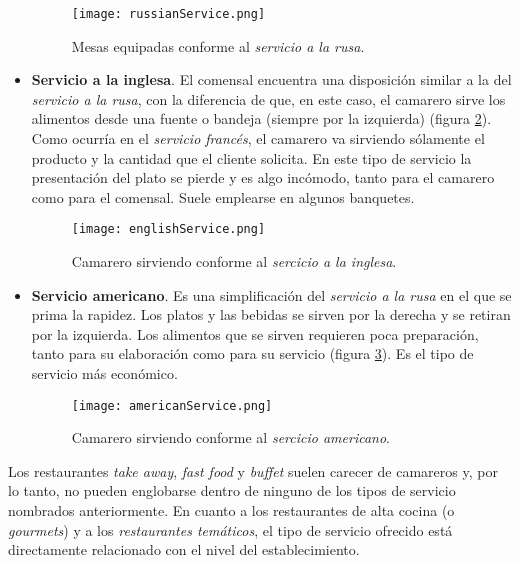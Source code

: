 \begin{itemize}
  \begin{figure}[!h]
    \begin{center}
      \texttt{[image: russianService.png]}
      \caption{Mesas equipadas conforme al \emph{servicio a la rusa}.}
      \label{fig:russianService}
    \end{center}
  \end{figure}

  \item \textbf{Servicio a la inglesa}. El comensal encuentra una disposición
  similar a la del \emph{servicio a la rusa}, con la diferencia de que, en este
  caso, el camarero sirve los alimentos desde una fuente o bandeja (siempre por
  la izquierda) (figura \ref{fig:englishService}). Como ocurría en el
  \emph{servicio francés}, el camarero va sirviendo sólamente el producto y la
  cantidad que el cliente solicita. En este tipo de servicio la presentación 
  del plato se pierde y es algo incómodo, tanto para el camarero como para el 
  comensal. Suele emplearse en algunos banquetes.

  \begin{figure}[!h]
    \begin{center}
      \texttt{[image: englishService.png]}
      \caption{Camarero sirviendo conforme al \emph{sercicio a la inglesa}.}
      \label{fig:englishService}
    \end{center}
  \end{figure}

  \item \textbf{Servicio americano}. Es una simplificación del \emph{servicio a
  la rusa} en el que se prima la rapidez. Los platos y las bebidas se sirven
  por la derecha y se retiran por la izquierda. Los alimentos que se sirven
  requieren poca preparación, tanto para su elaboración como para su servicio
  (figura \ref{fig:americanService}). Es el tipo de servicio más económico.

  \begin{figure}[!h]
    \begin{center}
      \texttt{[image: americanService.png]}
      \caption{Camarero sirviendo conforme al \emph{sercicio americano}.}
      \label{fig:americanService}
    \end{center}
  \end{figure}

  \end{itemize}

  Los restaurantes \emph{take away}, \emph{fast food} y \emph{buffet} suelen
  carecer de camareros y, por lo tanto, no pueden englobarse dentro de ninguno 
  de los tipos de servicio nombrados anteriormente. En cuanto a los 
  restaurantes de alta cocina (o \emph{gourmets}) y a los \emph{restaurantes 
  temáticos}, el tipo de servicio ofrecido está directamente relacionado con 
  el nivel del establecimiento.

